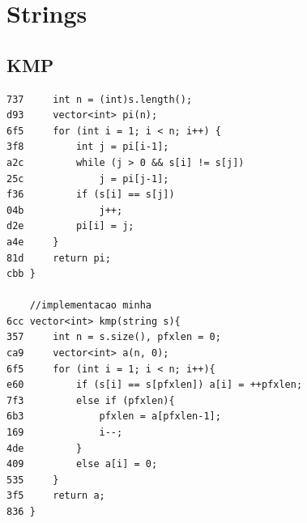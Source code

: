 \documentclass[11pt, a4paper, twoside]{article}
\begin{document}
%
%

\section{Strings}

\subsection{KMP}
\begin{lstlisting}
737     int n = (int)s.length();
d93     vector<int> pi(n);
6f5     for (int i = 1; i < n; i++) {
3f8         int j = pi[i-1];
a2c         while (j > 0 && s[i] != s[j])
25c             j = pi[j-1];
f36         if (s[i] == s[j])
04b             j++;
d2e         pi[i] = j;
a4e     }
81d     return pi;
cbb }
    
    //implementacao minha
6cc vector<int> kmp(string s){
357     int n = s.size(), pfxlen = 0;
ca9     vector<int> a(n, 0);
6f5     for (int i = 1; i < n; i++){
e60         if (s[i] == s[pfxlen]) a[i] = ++pfxlen;
7f3         else if (pfxlen){
6b3             pfxlen = a[pfxlen-1];
169             i--;
4de         }
409         else a[i] = 0;
535     }
3f5     return a;
836 }
\end{lstlisting}
\end{document}
